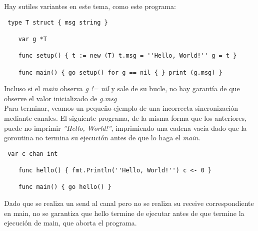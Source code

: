 Hay sutiles variantes en este tema, como este programa:

\begin{verbatim} type T struct { msg string }
    
	var g *T
    
	func setup() { t := new (T) t.msg = ''Hello, World!'' g = t }
    
	func main() { go setup() for g == nil { } print (g.msg) } \end{verbatim}

Incluso si el \textit{main} observa \textit{g != nil} y sale de su bucle, no hay
garantía de que observe el valor inicializado de \textit{g.msg}\\

Para terminar, veamos un pequeño ejemplo de una incorrecta sincronización
mediante canales. El siguiente programa, de la misma forma que los anteriores,
puede no imprimir \textit{''Hello, World!''}, imprimiendo una cadena vacía dado
que la goroutina no termina su ejecución antes de que lo haga el \textit{main}.

\begin{verbatim} var c chan int

	func hello() { fmt.Println(''Hello, World!'') c <- 0 }
    
	func main() { go hello() } \end{verbatim}

Dado que se realiza un send al canal pero no se realiza su receive
correspondiente en main, no se garantiza que hello termine de ejecutar antes de
que termine la ejecución de main, que aborta el programa.
